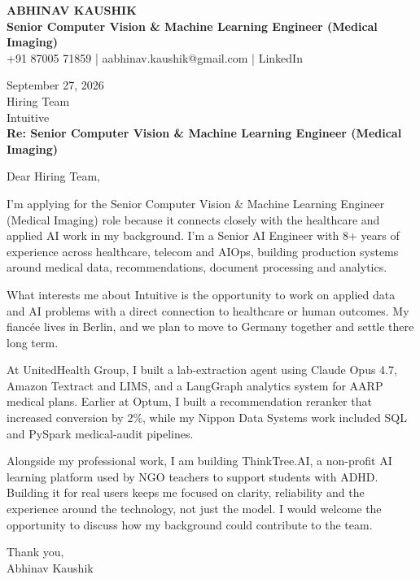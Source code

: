 \documentclass[10pt,a4paper]{article}
\begin{document}
\begin{center}
{\Large\bfseries ABHINAV KAUSHIK}\\[2pt]
{\bfseries Senior Computer Vision \& Machine Learning Engineer (Medical Imaging)}\\[2pt]
+91 87005 71859 \quad | \quad aabhinav.kaushik@gmail.com \quad | \quad LinkedIn
\end{center}
\vspace{8pt}
September 27, 2026\\[6pt]
Hiring Team\\
Intuitive\\[4pt]
\textbf{Re: Senior Computer Vision \& Machine Learning Engineer (Medical Imaging)}

Dear Hiring Team,

I’m applying for the Senior Computer Vision \& Machine Learning Engineer (Medical Imaging) role because it connects closely with the healthcare and applied AI work in my background. I’m a Senior AI Engineer with 8+ years of experience across healthcare, telecom and AIOps, building production systems around medical data, recommendations, document processing and analytics.

What interests me about Intuitive is the opportunity to work on applied data and AI problems with a direct connection to healthcare or human outcomes. My fiancée lives in Berlin, and we plan to move to Germany together and settle there long term.

At UnitedHealth Group, I built a lab-extraction agent using Claude Opus 4.7, Amazon Textract and LIMS, and a LangGraph analytics system for AARP medical plans. Earlier at Optum, I built a recommendation reranker that increased conversion by 2\%, while my Nippon Data Systems work included SQL and PySpark medical-audit pipelines.

Alongside my professional work, I am building ThinkTree.AI, a non-profit AI learning platform used by NGO teachers to support students with ADHD. Building it for real users keeps me focused on clarity, reliability and the experience around the technology, not just the model. I would welcome the opportunity to discuss how my background could contribute to the team.

Thank you,\\
Abhinav Kaushik
\end{document}

